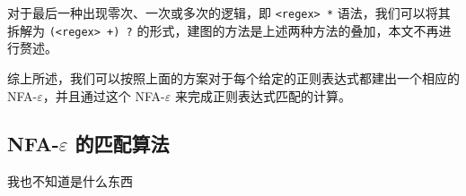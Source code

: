 \documentclass[hyperref,UTF8,12pt,a4paper]{ctexart}
\begin{document}
对于最后一种出现零次、一次或多次的逻辑，即 \verb|<regex> *| 语法，我们可以将其拆解为 \verb|(<regex> +) ?| 的形式，建图的方法是上述两种方法的叠加，本文不再进行赘述。

综上所述，我们可以按照上面的方案对于每个给定的正则表达式都建出一个相应的 NFA-$\varepsilon$，并且通过这个 NFA-$\varepsilon$ 来完成正则表达式匹配的计算。

\subsection{NFA-$\varepsilon$ 的匹配算法}



\newpage



\begin{thebibliography}{99}
 我也不知道是什么东西

\end {thebibliography}
\end{document}
